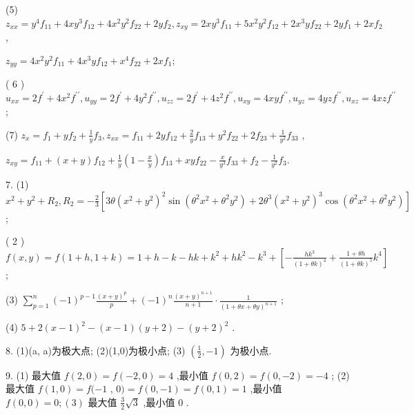 (5) \({z}_{xx} = {y}^{4}{f}_{11} + {4x}{y}^{3}{f}_{12} + 4{x}^{2}{y}^{2}{f}_{22} + {2y}{f}_{2},{z}_{xy} = {2x}{y}^{3}{f}_{11} + 5{x}^{2}{y}^{2}{f}_{12} + 2{x}^{3}y{f}_{22} + {2y}{f}_{1} + {2x}{f}_{2}\) ,

\({z}_{yy} = 4{x}^{2}{y}^{2}{f}_{11} + 4{x}^{3}y{f}_{12} + {x}^{4}{f}_{22} + {2x}{f}_{1};\)

( 6 ) \({u}_{xx} = 2{f}^{\prime } + 4{x}^{2}{f}^{\prime \prime },{u}_{yy} = 2{f}^{\prime } + 4{y}^{2}{f}^{\prime \prime },{u}_{zz} = 2{f}^{\prime } + 4{z}^{2}{f}^{\prime \prime },{u}_{xy} = {4xy}{f}^{\prime \prime },{u}_{yz} = {4yz}{f}^{\prime \prime },{u}_{xz} = {4xz}{f}^{\prime \prime }\) ;

(7) \({z}_{x} = {f}_{1} + y{f}_{2} + \frac{1}{y}{f}_{3},{z}_{xx} = {f}_{11} + {2y}{f}_{12} + \frac{2}{y}{f}_{13} + {y}^{2}{f}_{22} + 2{f}_{23} + \frac{1}{{y}^{2}}{f}_{33}\) ,

\({z}_{xy} = {f}_{11} + \left( {x + y}\right) {f}_{12} + \frac{1}{y}\left( {1 - \frac{x}{y}}\right) {f}_{13} + {xy}{f}_{22} - \frac{x}{{y}^{3}}{f}_{33} + {f}_{2} - \frac{1}{{y}^{2}}{f}_{3}.\)

7. (1) \({x}^{2} + {y}^{2} + {R}_{2},{R}_{2} =  - \frac{2}{3}\left\lbrack  {{3\theta }{\left( {x}^{2} + {y}^{2}\right) }^{2}\sin \left( {{\theta }^{2}{x}^{2} + {\theta }^{2}{y}^{2}}\right)  + 2{\theta }^{3}{\left( {x}^{2} + {y}^{2}\right) }^{3}\cos \left( {{\theta }^{2}{x}^{2} + {\theta }^{2}{y}^{2}}\right) }\right\rbrack\) ;

( 2 ) \(f\left( {x,y}\right)  = f\left( {1 + h,1 + k}\right)  = 1 + h - k - {hk} + {k}^{2} + h{k}^{2} - {k}^{3} + \left\lbrack  {-\frac{h{k}^{3}}{{\left( 1 + \theta k\right) }^{4}} + \frac{1 + {\theta h}}{{\left( 1 + \theta k\right) }^{5}}{k}^{4}}\right\rbrack\) ;

(3) \(\mathop{\sum }\limits_{{p = 1}}^{n}{\left( -1\right) }^{p - 1}\frac{{\left( x + y\right) }^{p}}{p} + {\left( -1\right) }^{n}\frac{{\left( x + y\right) }^{n + 1}}{n + 1} \cdot  \frac{1}{{\left( 1 + \theta x + \theta y\right) }^{n + 1}}\) ;

(4) \(5 + 2{\left( x - 1\right) }^{2} - \left( {x - 1}\right) \left( {y + 2}\right)  - {\left( y + 2\right) }^{2}\) .

8. (1)(a, a)为极大点; (2)(1,0)为极小点; (3) \(\left( {\frac{1}{2}, - 1}\right)\) 为极小点.

9. (1) 最大值 \(f\left( {2,0}\right)  = f\left( {-2,0}\right)  = 4\) ,最小值 \(f\left( {0,2}\right)  = f\left( {0, - 2}\right)  =  - 4\) ; (2) 最大值 \(f\left( {1,0}\right)  = f( - 1\) , \(0) = f\left( {0, - 1}\right)  = f\left( {0,1}\right)  = 1\) ,最小值 \(f\left( {0,0}\right)  = 0;\left( 3\right)\) 最大值 \(\frac{3}{2}\sqrt{3}\) ,最小值 0 .

